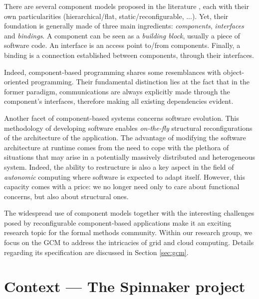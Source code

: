 	There are several component models proposed in the literature \cite{fractalSpec,BCDGHP:Telecom08}, 
	each with their own particularities
	(hierarchical/flat, static/reconfigurable, ...). Yet,
	their foundation is generally made of three main ingredients:
	\textit{components}, \textit{interfaces} and \textit{bindings}. A component can be seen as a 
	\textit{building block}, usually a piece of software code. An interface is an access point to/from 
	components. Finally, a binding is a connection established between components, 
	through their interfaces.	
	
	Indeed, component-based programming shares some resemblances with object-oriented programming.
	Their fundamental distinction lies at the fact that in the former paradigm, 
	communications are always	explicitly made through the component's interfaces, 
	therefore making all existing dependencies evident.

	Another facet of component-based systems concerns software evolution.	
	This methodology of developing software enables \textit{on-the-fly} structural 
	reconfigurations of the architecture of the application. The advantage of modifying the software 
	architecture at runtime comes from the need to cope with the plethora of situations 
	that may arise in a potentially massively distributed and heterogeneous system.  Indeed,
	the ability to restructure is also a key aspect in	the field of \textit{autonomic} computing 
	where software is expected to adapt itself.	However, this capacity comes with a price: 
	we no longer need only to care about functional concerns, but also  about structural ones.
	
		
	The widespread use of component models together with the interesting challenges posed by 
	reconfigurable component-based applications make it an exciting research
	topic for the formal methods community. Within our research group, we focus on the 
	\ac{GCM} \cite{BCDGHP:Telecom08} to address the intricacies of grid 
	and cloud computing. Details regarding its specification are discussed in Section \ref{sec:gcm}.



\section{Context --- The Spinnaker project}
\label{sec:spinnaker}


%


